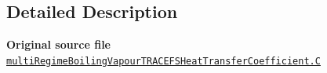 \subsection{Detailed Description}
{\bfseries Original source file} \href{../../../home/carlo/data/GeN-Foam/GeN-Foam_ffn/GeN-Foam/GeN-Foam/classes/thermalHydraulics/src/physicsModels/heatTransferModels/FSHeatTransferCoefficientModels/multiRegimeBoilingVapourTRACE/multiRegimeBoilingVapourTRACEFSHeatTransferCoefficient.C}{\tt multi\+Regime\+Boiling\+Vapour\+T\+R\+A\+C\+E\+F\+S\+Heat\+Transfer\+Coefficient.\+C} 